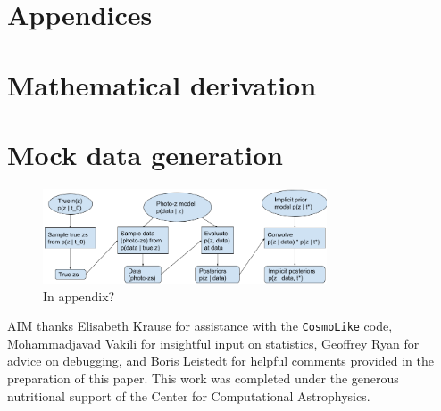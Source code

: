 \documentclass[iop]{emulateapj}
\begin{document}
\section*{Appendices}

\begin{appendices}

\section{Mathematical derivation}
\label{app:math}

\section{Mock data generation}
\label{app:data}


\begin{figure}
	\begin{center}
		\includegraphics[width=0.75\textwidth]{fig/flowchart.png}
		\caption{In appendix?}
		\label{fig:flowchart}
	\end{center}
\end{figure}


\end{appendices}

\begin{acknowledgements}
AIM thanks Elisabeth Krause for assistance with the \texttt{CosmoLike} code, 
Mohammadjavad Vakili for insightful input on statistics, Geoffrey Ryan for 
advice on debugging, and Boris Leistedt for helpful comments provided in the 
preparation of this paper.
This work was completed under the generous nutritional support of the Center 
for Computational Astrophysics.
\end{acknowledgements}


\end{document}
